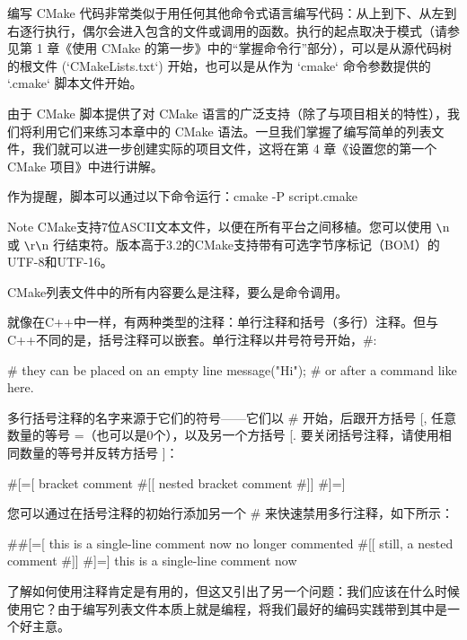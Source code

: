 编写 CMake 代码非常类似于用任何其他命令式语言编写代码：从上到下、从左到右逐行执行，偶尔会进入包含的文件或调用的函数。执行的起点取决于模式（请参见第 1 章《使用 CMake 的第一步》中的“掌握命令行”部分），可以是从源代码树的根文件 (`CMakeLists.txt`) 开始，也可以是从作为 `cmake` 命令参数提供的 `.cmake` 脚本文件开始。

由于 CMake 脚本提供了对 CMake 语言的广泛支持（除了与项目相关的特性），我们将利用它们来练习本章中的 CMake 语法。一旦我们掌握了编写简单的列表文件，我们就可以进一步创建实际的项目文件，这将在第 4 章《设置您的第一个 CMake 项目》中进行讲解。

作为提醒，脚本可以通过以下命令运行：cmake -P script.cmake

\begin{myNotic}{Note}
CMake支持7位ASCII文本文件，以便在所有平台之间移植。您可以使用 \verb|\|n 或 \verb|\|r\verb|\|n 行结束符。版本高于3.2的CMake支持带有可选字节序标记（BOM）的UTF-8和UTF-16。

\end{myNotic}

CMake列表文件中的所有内容要么是注释，要么是命令调用。


就像在C++中一样，有两种类型的注释：单行注释和括号（多行）注释。但与C++不同的是，括号注释可以嵌套。单行注释以井号符号开始，\#:

\begin{cmake}
# they can be placed on an empty line
message("Hi"); # or after a command like here.
\end{cmake}

多行括号注释的名字来源于它们的符号——它们以 \# 开始，后跟开方括号 [, 任意数量的等号 =（也可以是0个），以及另一个方括号 [. 要关闭括号注释，请使用相同数量的等号并反转方括号 ]：

\begin{cmake}
#[=[
bracket comment
  #[[
    nested bracket comment
  #]]
#]=]
\end{cmake}

您可以通过在括号注释的初始行添加另一个 \# 来快速禁用多行注释，如下所示：

\begin{cmake}
##[=[ this is a single-line comment now
no longer commented
  #[[
    still, a nested comment
  #]]
#]=] this is a single-line comment now
\end{cmake}

了解如何使用注释肯定是有用的，但这又引出了另一个问题：我们应该在什么时候使用它？由于编写列表文件本质上就是编程，将我们最好的编码实践带到其中是一个好主意。

